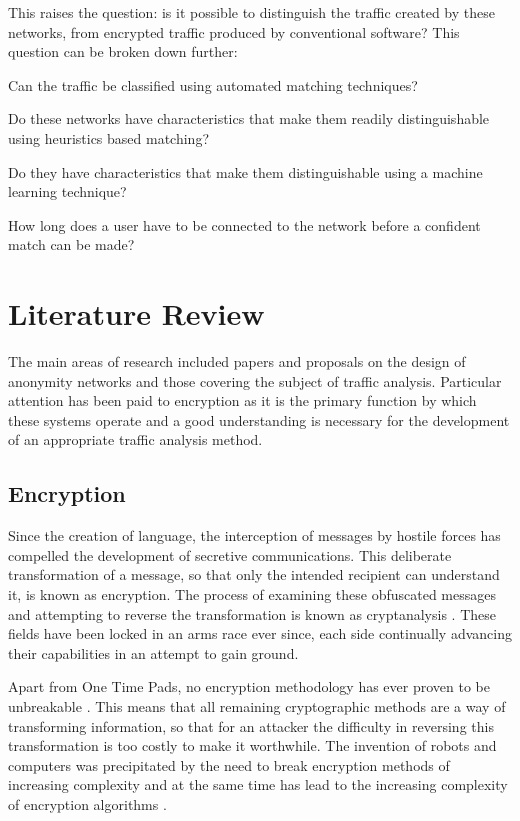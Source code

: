 \documentclass{ecuthesis}
\begin{document}
This raises the question: is it possible to distinguish the traffic created by
these networks, from encrypted traffic produced by conventional software? This
question can be broken down further:

\begin{enumerate*}
  \item Can the traffic be classified using automated matching techniques?
  \item Do these networks have characteristics that make them readily
    distinguishable using heuristics based matching?
  \item Do they have characteristics that make them distinguishable using a
    machine learning technique?
  \item How long does a user have to be
    connected to the network before a confident match can be made?
\end{enumerate*}

\chapter{Literature Review}

The main areas of research included papers and proposals on the design of
anonymity networks and those covering the subject of traffic analysis.
Particular attention has been paid to encryption as it is the primary function
by which these systems operate and a good understanding is necessary for the
development of an appropriate traffic analysis method.

\section{Encryption}

Since the creation of language, the interception of messages by hostile forces
has compelled the development of secretive communications. This deliberate
transformation of a message, so that only the intended recipient can understand
it, is known as encryption. The process of examining these obfuscated messages
and attempting to reverse the transformation is known as cryptanalysis
\parencite{Schneier:1996uq}. These fields have been locked in an arms race
ever since, each side continually advancing their capabilities in an attempt to
gain ground.

Apart from One Time Pads, no encryption methodology has ever proven to be
unbreakable \parencite{Shannon:1948p6583}. This means that all remaining
cryptographic methods are a way of transforming information, so that for an
attacker the difficulty in reversing this transformation is too costly to make
it worthwhile. The invention of robots and computers was precipitated by the
need to break encryption methods of increasing complexity and at the same time
has lead to the increasing complexity of encryption algorithms
\parencite{Kahn:1974:C}.
\end{document}
